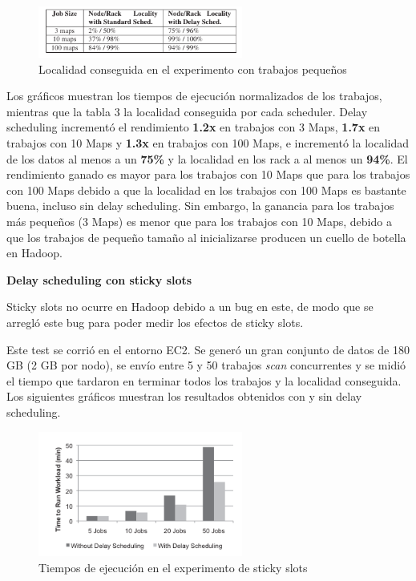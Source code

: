 \begin{figure}[H]
\begin{center}
\includegraphics[width=0.6\textwidth]{img/img6.png}
     \caption{Localidad conseguida en el experimento con trabajos pequeños}
\end{center}
\end{figure}

Los gráficos muestran los tiempos de ejecución normalizados de los trabajos, mientras que la tabla 3 la localidad conseguida por cada scheduler. Delay scheduling incrementó el rendimiento \textbf{1.2x} en trabajos con 3 Maps, \textbf{1.7x} en trabajos con 10 Maps y \textbf{1.3x} en trabajos con 100 Maps, e incrementó la localidad de los datos al menos a un \textbf{75\%} y la localidad en los rack a al menos un \textbf{94\%}. El rendimiento ganado es mayor para los trabajos con 10 Maps que para los trabajos con 100 Maps debido a que la localidad en los trabajos con 100 Maps es bastante buena, incluso sin delay scheduling. Sin embargo, la ganancia para los trabajos más pequeños (3 Maps) es menor que para los trabajos con 10 Maps, debido a que los trabajos de pequeño tamaño al inicializarse producen un cuello de botella en Hadoop.\\


\begin{center}
	\textbf{Delay scheduling con sticky slots}
\end{center}

Sticky slots no ocurre en Hadoop debido a un bug en este, de modo que se arregló este bug para poder medir los efectos de sticky slots.

Este test se corrió en el entorno EC2. Se generó un gran conjunto de datos de 180 GB (2 GB por nodo), se envío entre 5 y 50 trabajos \textit{scan} concurrentes y se midió el tiempo que tardaron en terminar todos los trabajos y la localidad conseguida. Los siguientes gráficos muestran los resultados obtenidos con y sin delay scheduling. 

\begin{figure}[H]
\begin{center}
\includegraphics[width=0.6\textwidth]{img/img7.png}
     \caption{Tiempos de ejecución en el experimento de sticky slots}
\end{center}
\end{figure}

